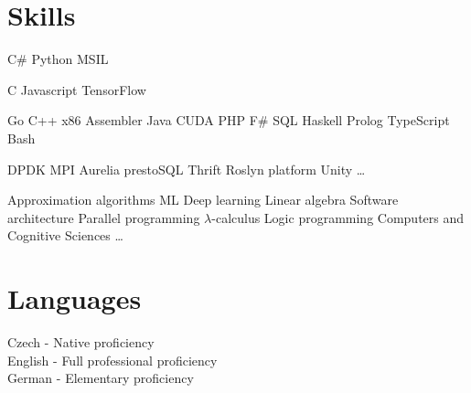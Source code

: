 \documentclass[a4paper]{deedy-resume} %
\begin{document}
\begin{minipage}[t]{0.33\textwidth}
\sectionspace %


\section{Skills}


C\# \textbullet{}  Python \textbullet{} MSIL \\ 
\halfsectionspace %

C \textbullet{} Javascript \textbullet{} TensorFlow \\
\halfsectionspace %

Go \textbullet{} C++ \textbullet{} x86 Assembler \textbullet{} Java \textbullet{} CUDA \textbullet{} PHP \textbullet{} F\# \textbullet SQL \textbullet{} Haskell \textbullet{} Prolog \textbullet TypeScript \textbullet{} Bash \\

\sectionspace %

DPDK \textbullet{} MPI \textbullet{} Aurelia \textbullet{} prestoSQL \textbullet{} Thrift \textbullet{} Roslyn platform \textbullet{} Unity \textbullet{} \ldots \\

\sectionspace %


Approximation algorithms \textbullet{} ML \textbullet{} Deep learning \textbullet{} Linear algebra \textbullet{} Software architecture \textbullet{} Parallel programming \textbullet{} $\lambda$-calculus \textbullet{} Logic programming \textbullet{} Computers and Cognitive Sciences \textbullet{} \ldots 

\sectionspace %

\section{Languages}

Czech - Native proficiency \\
English - Full professional proficiency \\
German - Elementary proficiency


\end{minipage}
\end{document}
